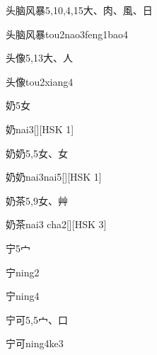 \begin{entry}{头脑风暴}{5,10,4,15}{⼤、⾁、⾵、⽇}
  \begin{phonetics}{头脑风暴}{tou2nao3feng1bao4}
  \end{phonetics}
\end{entry}

\begin{entry}{头像}{5,13}{⼤、⼈}
  \begin{phonetics}{头像}{tou2xiang4}
  \end{phonetics}
\end{entry}

\begin{entry}{奶}{5}{⼥}
  \begin{phonetics}{奶}{nai3}[][HSK 1]
  \end{phonetics}
\end{entry}

\begin{entry}{奶奶}{5,5}{⼥、⼥}
  \begin{phonetics}{奶奶}{nai3nai5}[][HSK 1]
  \end{phonetics}
\end{entry}

\begin{entry}{奶茶}{5,9}{⼥、⾋}
  \begin{phonetics}{奶茶}{nai3 cha2}[][HSK 3]
  \end{phonetics}
\end{entry}

\begin{entry}{宁}{5}{⼧}
  \begin{phonetics}{宁}{ning2}
  \end{phonetics}
  \begin{phonetics}{宁}{ning4}
  \end{phonetics}
\end{entry}

\begin{entry}{宁可}{5,5}{⼧、⼝}
  \begin{phonetics}{宁可}{ning4ke3}
  \end{phonetics}
\end{entry}

